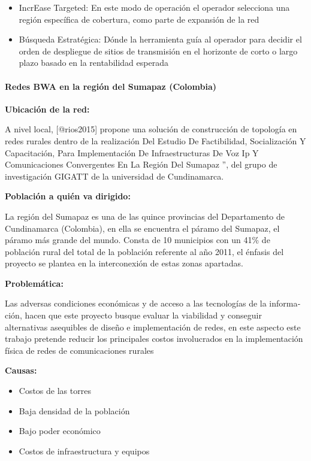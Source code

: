 \documentclass[]{article}
\providecommand{\tightlist}{%
  \setlength{\itemsep}{0pt}\setlength{\parskip}{0pt}}
\let\oldparagraph\paragraph
\renewcommand{\paragraph}[1]{\oldparagraph{#1}\mbox{}}
\begin{document}
\begin{itemize}
\item
  IncrEase Targeted: En este modo de operación el operador selecciona
  una región específica de cobertura, como parte de expansión de la red
\item
  Búsqueda Estratégica: Dónde la herramienta guía al operador para
  decidir el orden de despliegue de sitios de transmisión en el
  horizonte de corto o largo plazo basado en la rentabilidad esperada
\end{itemize}

\paragraph{Redes BWA en la región del Sumapaz
(Colombia)}\label{redes-bwa-en-la-regiuxf3n-del-sumapaz-colombia}

\textbf{Ubicación de la red:}

A nivel local, {[}@rios2015{]} propone una solución de construcción de
topología en redes rurales dentro de la realización Del Estudio De
Factibilidad, Socialización Y Capacitación, Para Implementación De
Infraestructuras De Voz Ip Y Comunicaciones Convergentes En La Región
Del Sumapaz '', del grupo de investigación GIGATT de la universidad de
Cundinamarca.

\textbf{Población a quién va dirigido:}

La región del Sumapaz es una de las quince provincias del Departamento
de Cundinamarca (Colombia), en ella se encuentra el páramo del Sumapaz,
el páramo más grande del mundo. Consta de 10 municipios con un 41\% de
población rural del total de la población referente al año 2011, el
énfasis del proyecto se plantea en la interconexión de estas zonas
apartadas.

\textbf{Problemática:}

Las adversas condiciones económicas y de acceso a las tecnologías de la
informa­ción, hacen que este proyecto busque evaluar la viabilidad y
conseguir alternativas asequibles de diseño e implementación de redes,
en este aspecto este trabajo pretende reducir los principales costos
involucrados en la implementación física de redes de comunicaciones
rurales

\textbf{Causas:}

\begin{itemize}
\tightlist
\item
  Costos de las torres
\item
  Baja densidad de la población
\item
  Bajo poder económico
\item
  Costos de infraestructura y equipos
\end{itemize}
\end{document}
